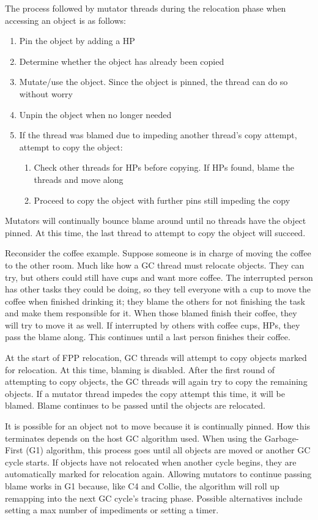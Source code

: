 \documentclass{sig-alternate}
\begin{document}
The process followed by mutator threads during the relocation phase when 
accessing an object is as follows:
\begin{enumerate}
\item Pin the object by adding a HP
\item Determine whether the object has already been copied
\item Mutate/use the object. Since the object is pinned, the thread can 
do so without worry
\item Unpin the object when no longer needed
\item If the thread was blamed due to impeding another thread's copy attempt, 
attempt to copy the object:
\begin{enumerate}
\item Check other threads for HPs before copying. If HPs found,
blame the threads and move along
\item Proceed to copy the object with further pins still impeding the copy
\end{enumerate}
\end{enumerate}
Mutators will continually bounce blame around until
no threads have the object pinned. At this time, the last thread
to attempt to copy the object will succeed.

Reconsider the coffee example. Suppose
someone is in charge of moving the coffee to the other room.
Much like how a GC thread must relocate objects. They
can try, but others could still have cups and want more coffee.
The interrupted person has other tasks they could be doing, so they tell
everyone with a cup to move the coffee when finished drinking it;
they blame the others for not finishing the task and make them responsible
for it. When those blamed finish their coffee, they will try to
move it as well. If interrupted by others with coffee cups, HPs, they
pass the blame along. This continues until a last person finishes 
their coffee.

At the start of FPP relocation, GC threads will attempt to copy
objects marked for relocation. At this time, blaming is 
disabled. 
After the first round of attempting to copy objects, the GC threads
will again try to copy the remaining objects. If a mutator 
thread impedes the copy attempt this time, it will be blamed.
Blame continues to be passed until the objects are relocated. 

It is possible for an
object not to move because it is continually pinned. How this terminates 
depends on the host GC algorithm used. When using the Garbage-First (G1) algorithm,
this process goes until all objects are moved or another GC cycle starts.
If objects have not relocated when another cycle begins, they are automatically
marked for relocation again. Allowing mutators to continue passing blame works
in G1 because, like C4 and Collie, the algorithm will roll up remapping into the next
GC cycle's tracing phase. Possible alternatives include setting a max number of impediments
or setting a timer.
\end{document}
